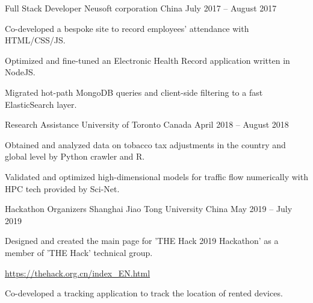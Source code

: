 

\begin{cventries}

  \cventry
    {Full Stack Developer} %
    {Neusoft corporation} %
    {China} %
    {July 2017 – August 2017} %
    {
      \begin{cvitems} %
        \item {Co-developed a bespoke site to record employees’ attendance with HTML/CSS/JS.}
        \item {Optimized and fine-tuned an Electronic Health Record application written in NodeJS.}
        \item {Migrated hot-path MongoDB queries and client-side filtering to a fast ElasticSearch layer.}
      \end{cvitems}
    }

  \cventry
    {Research Assistance} %
    {University of Toronto} %
    {Canada} %
    {April 2018 – August 2018} %
    {
      \begin{cvitems} %
        \item {Obtained and analyzed data on tobacco tax adjustments in the country and global level by Python crawler and R.}
        \item {Validated and optimized high-dimensional models for traffic flow numerically with HPC tech provided by Sci-Net.}
      \end{cvitems}
    }

  \cventry
    {Hackathon Organizers} %
    {Shanghai Jiao Tong University} %
    {China} %
    {May 2019 – July 2019} %
    {
      \begin{cvitems} %
        \item {Designed and created the main page for 'THE Hack 2019 Hackathon' as a member of 'THE Hack' technical group.}
        \item {\url{https://thehack.org.cn/index_EN.html}}
        \item {Co-developed a tracking application to track the location of rented devices.}
      \end{cvitems}
    }
\end{cventries}
